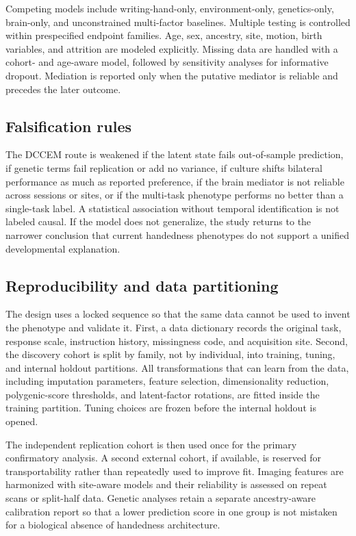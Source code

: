 \documentclass[10pt,conference]{IEEEtran}
\begin{document}
Competing models include writing-hand-only, environment-only, genetics-only, brain-only, and unconstrained multi-factor baselines. Multiple testing is controlled within prespecified endpoint families. Age, sex, ancestry, site, motion, birth variables, and attrition are modeled explicitly. Missing data are handled with a cohort- and age-aware model, followed by sensitivity analyses for informative dropout. Mediation is reported only when the putative mediator is reliable and precedes the later outcome.

\subsection{Falsification rules}
The DCCEM route is weakened if the latent state fails out-of-sample prediction, if genetic terms fail replication or add no variance, if culture shifts bilateral performance as much as reported preference, if the brain mediator is not reliable across sessions or sites, or if the multi-task phenotype performs no better than a single-task label. A statistical association without temporal identification is not labeled causal. If the model does not generalize, the study returns to the narrower conclusion that current handedness phenotypes do not support a unified developmental explanation.

\subsection{Reproducibility and data partitioning}
The design uses a locked sequence so that the same data cannot be used to invent the phenotype and validate it. First, a data dictionary records the original task, response scale, instruction history, missingness code, and acquisition site. Second, the discovery cohort is split by family, not by individual, into training, tuning, and internal holdout partitions. All transformations that can learn from the data, including imputation parameters, feature selection, dimensionality reduction, polygenic-score thresholds, and latent-factor rotations, are fitted inside the training partition. Tuning choices are frozen before the internal holdout is opened.

The independent replication cohort is then used once for the primary confirmatory analysis. A second external cohort, if available, is reserved for transportability rather than repeatedly used to improve fit. Imaging features are harmonized with site-aware models and their reliability is assessed on repeat scans or split-half data. Genetic analyses retain a separate ancestry-aware calibration report so that a lower prediction score in one group is not mistaken for a biological absence of handedness architecture.
\end{document}
